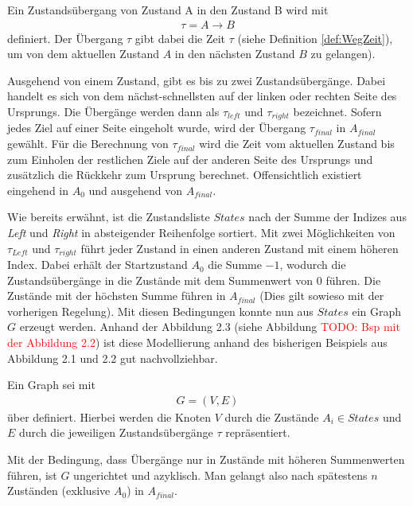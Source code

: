 \documentclass[german,version-2019-11]{uzl-thesis}
\begin{document}
\begin{definition}
Ein Zustandsübergang von Zustand A in den Zustand B wird mit
\begin{align*}
\tau = A\rightarrow B
\end{align*}
definiert. Der Übergang $\tau$ gibt dabei die Zeit $\tau$ (siehe Definition \ref{def:WegZeit}), um von dem aktuellen Zustand $A$ in den nächsten Zustand $B$ zu gelangen).
\end{definition}

Ausgehend von einem Zustand, gibt es bis zu zwei Zustandsübergänge. Dabei handelt es sich von dem nächst-schnellsten auf der linken oder rechten Seite des Ursprungs. Die Übergänge werden dann als $\tau_{left}$ und $\tau_{right}$ bezeichnet. Sofern jedes Ziel auf einer Seite eingeholt wurde, wird der Übergang $\tau_{final}$ in $A_{final}$ gewählt. Für die Berechnung von $\tau_{final}$ wird die Zeit vom aktuellen Zustand bis zum Einholen der restlichen Ziele auf der anderen Seite des Ursprungs und zusätzlich die Rückkehr zum Ursprung berechnet. Offensichtlich existiert eingehend in $A_0$ und ausgehend von $A_{final}$. 

Wie bereits erwähnt, ist die Zustandsliste $States$ nach der Summe der Indizes aus \emph{Left} und \emph{Right} in absteigender Reihenfolge sortiert. Mit zwei Möglichkeiten von $\tau_{Left}$ und $\tau_{right}$ führt jeder Zustand in einen anderen Zustand mit einem höheren Index. Dabei erhält der Startzustand $A_0$ die Summe $-1$, wodurch die Zustandsübergänge in die Zustände mit dem Summenwert von $0$ führen. Die Zustände mit der höchsten Summe führen in $A_{final}$ (Dies gilt sowieso mit der vorherigen Regelung). Mit diesen Bedingungen konnte nun aus $States$ ein Graph $G$ erzeugt werden. Anhand der Abbildung 2.3 (siehe Abbildung \textcolor{red}{TODO: Bsp mit der Abbildung 2.2}) ist diese Modellierung anhand des bisherigen Beispiels aus Abbildung 2.1 und 2.2 gut nachvollziehbar.

\begin{definition}
Ein Graph sei mit
\begin{align*}
G = (V,E)
\end{align*}
über definiert. Hierbei werden die Knoten $V$ durch die Zustände $A_i \in States$ und $E$ durch die jeweiligen Zustandsübergänge $\tau$ repräsentiert.
\end{definition}

Mit der Bedingung, dass Übergänge nur in Zustände mit höheren Summenwerten führen, ist $G$ ungerichtet und azyklisch. Man gelangt also nach spätestens $n$ Zuständen (exklusive $A_0$) in $A_{final}$. 
\end{document}
